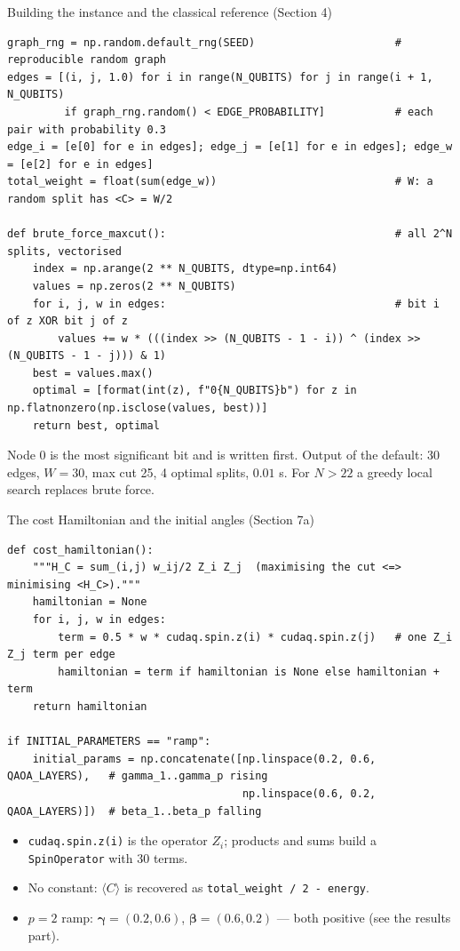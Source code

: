 \documentclass[aspectratio=169,11pt]{beamer}
\newcommand{\bg}{\boldsymbol\gamma}
\newcommand{\bb}{\boldsymbol\beta}
\begin{document}
\begin{frame}[fragile]{Building the instance and the classical reference (Section 4)}
\begin{lstlisting}[basicstyle=\ttfamily\fontsize{6.4}{7.6}\selectfont]
graph_rng = np.random.default_rng(SEED)                      # reproducible random graph
edges = [(i, j, 1.0) for i in range(N_QUBITS) for j in range(i + 1, N_QUBITS)
         if graph_rng.random() < EDGE_PROBABILITY]           # each pair with probability 0.3
edge_i = [e[0] for e in edges]; edge_j = [e[1] for e in edges]; edge_w = [e[2] for e in edges]
total_weight = float(sum(edge_w))                            # W: a random split has <C> = W/2

def brute_force_maxcut():                                    # all 2^N splits, vectorised
    index = np.arange(2 ** N_QUBITS, dtype=np.int64)
    values = np.zeros(2 ** N_QUBITS)
    for i, j, w in edges:                                    # bit i of z XOR bit j of z
        values += w * (((index >> (N_QUBITS - 1 - i)) ^ (index >> (N_QUBITS - 1 - j))) & 1)
    best = values.max()
    optimal = [format(int(z), f"0{N_QUBITS}b") for z in np.flatnonzero(np.isclose(values, best))]
    return best, optimal
\end{lstlisting}
  \small Node 0 is the most significant bit and is written first. Output of the default: 30 edges, $W = 30$, max cut 25,
  4 optimal splits, $0.01$ s. For $N > 22$ a greedy local search replaces brute force.
\end{frame}

\begin{frame}[fragile]{The cost Hamiltonian and the initial angles (Section 7a)}
\begin{lstlisting}[basicstyle=\ttfamily\fontsize{6.4}{7.6}\selectfont]
def cost_hamiltonian():
    """H_C = sum_(i,j) w_ij/2 Z_i Z_j  (maximising the cut <=> minimising <H_C>)."""
    hamiltonian = None
    for i, j, w in edges:
        term = 0.5 * w * cudaq.spin.z(i) * cudaq.spin.z(j)   # one Z_i Z_j term per edge
        hamiltonian = term if hamiltonian is None else hamiltonian + term
    return hamiltonian

if INITIAL_PARAMETERS == "ramp":
    initial_params = np.concatenate([np.linspace(0.2, 0.6, QAOA_LAYERS),   # gamma_1..gamma_p rising
                                     np.linspace(0.6, 0.2, QAOA_LAYERS)])  # beta_1..beta_p falling
\end{lstlisting}
  \begin{itemize}\small
    \item \texttt{cudaq.spin.z(i)} is the operator $Z_i$; products and sums build a \texttt{SpinOperator} with 30 terms.
    \item No constant: $\langle C\rangle$ is recovered as \texttt{total\_weight / 2 - energy}.
    \item $p = 2$ ramp: $\bg = (0.2, 0.6)$, $\bb = (0.6, 0.2)$ --- both positive (see the results part).
  \end{itemize}
\end{frame}
\end{document}
